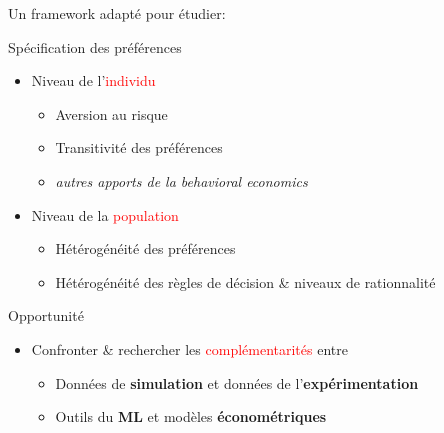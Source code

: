 \documentclass[11pt,ignorenonframetext,]{beamer}
\providecommand{\tightlist}{%
  \setlength{\itemsep}{0pt}\setlength{\parskip}{0pt}}
\begin{document}
\begin{frame}{Un framework adapté pour étudier:}
\protect\hypertarget{un-framework-adapte-pour-etudier-1}{}

\begin{block}{Spécification des préférences}

\begin{itemize}
\tightlist
\item
  Niveau de l'\textcolor{red}{individu}

  \begin{itemize}
  \tightlist
  \item
    Aversion au risque
  \item
    Transitivité des préférences
  \item
    \emph{autres apports de la behavioral economics}
  \end{itemize}
\item
  Niveau de la \textcolor{red}{population}

  \begin{itemize}
  \tightlist
  \item
    Hétérogénéité des préférences
  \item
    Hétérogénéité des règles de décision \& niveaux de rationnalité
  \end{itemize}
\end{itemize}

\end{block}

\begin{block}{Opportunité}

\begin{itemize}
\tightlist
\item
  Confronter \& rechercher les \textcolor{red}{complémentarités} entre

  \begin{itemize}
  \tightlist
  \item
    Données de \textbf{simulation} et données de
    l'\textbf{expérimentation}
  \item
    Outils du \textbf{ML} et modèles \textbf{économétriques}
  \end{itemize}
\end{itemize}

\end{block}

\end{frame}
\end{document}
